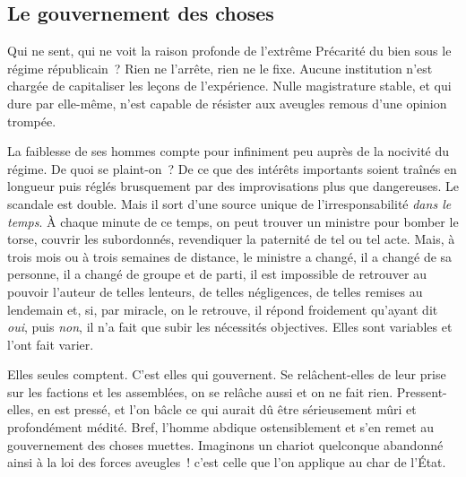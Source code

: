 \documentclass[french,twoside]{book} %
\newcommand{\astermono}{\medskip\centerline{\color{rubric}\large\selectfont{\syms ✻}}\medskip\par}%
\begin{document}
\astermono

\subsection[{Le gouvernement des choses}]{Le gouvernement des choses}
\noindent Qui ne sent, qui ne voit la raison profonde de l’extrême Précarité du bien sous le régime républicain ? Rien ne l’arrête, rien ne le fixe. Aucune institution n’est chargée de capitaliser les leçons de l’expérience. Nulle magistrature stable, et qui dure par elle-même, n’est capable de résister aux aveugles remous d’une opinion trompée.\par
La faiblesse de ses hommes compte pour infiniment peu auprès de la nocivité du régime. De quoi se plaint-on ? De ce que des intérêts importants soient traînés en longueur puis réglés brusquement par des improvisations plus que dangereuses. Le scandale est double. Mais il sort d’une source unique de l’irresponsabilité \emph{dans le temps}. À chaque minute de ce temps, on peut trouver un ministre pour bomber le torse, couvrir les subordonnés, revendiquer la paternité de tel ou tel acte. Mais, à trois mois ou à trois semaines de distance, le ministre a changé, il a changé de sa personne, il a changé de groupe et de parti, il est impossible de retrouver au pouvoir l’auteur de telles lenteurs, de telles négligences, de telles remises au lendemain et, si, par miracle, on le retrouve, il répond froidement qu’ayant dit \emph{oui}, puis \emph{non}, il n’a fait que subir les nécessités objectives. Elles sont variables et l’ont fait varier.\par
Elles seules comptent. C’est elles qui gouvernent. Se relâchent-elles de leur prise sur les factions et les assemblées, on se relâche aussi et on ne fait rien. Pressent-elles, en est pressé, et l’on bâcle ce qui aurait dû être sérieusement mûri et profondément médité. Bref, l’homme abdique ostensiblement et s’en remet au gouvernement des choses muettes. Imaginons un chariot quelconque abandonné ainsi à la loi des forces aveugles ! c’est celle que l’on applique au char de l’État.\par

\astermono
\end{document}
